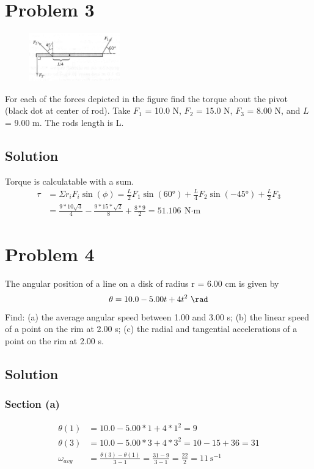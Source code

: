\documentclass[12pt]{article}
\begin{document}
\pagebreak
\section*{Problem 3}
\begin{figure}
    \vspace{-30pt}
    \includegraphics[width=0.35\textwidth]{graph_3.png} 
\end{figure}
For each of the forces depicted in the figure find the torque about the pivot (black dot at
center of rod). Take $F_1$ = 10.0 N, $F_2$ = 15.0 N, $F_3$ = 8.00 N, and $L$ = 9.00 m. The 
rods length is L.

\subsection*{Solution}
Torque is calculatable with a sum.
\begin{align*}
    \tau    &=   \Sigma r_i F_i \sin(\phi)
        =   \frac{L}{2} F_1 \sin(60\unit{\degree}) + \frac{L}{4} F_2 \sin(-45\unit{\degree}) + \frac{L}{2} F_3\\
        &=  \frac{9*10\sqrt{3}}{4} - \frac{9*15*\sqrt{2}}{8} + \frac{8*9}{2}
        =   \boxed{51.106\ \unit{\newton\cdot\meter}}
\end{align*}


\pagebreak
\section*{Problem 4}
The angular position of a line on a disk of radius r = 6.00 cm is given by
\[ \theta = 10.0 - 5.00 t + 4 t^2\ \unit{\rad} \]
Find: (a) the average angular speed between 1.00 and 3.00 s; (b) the linear speed of a point on
the rim at 2.00 s; (c) the radial and tangential accelerations of a point on the rim at 2.00 s.

\subsection*{Solution}
\subsubsection*{Section (a)}
\begin{align*}
    \theta(1)   &=  10.0 - 5.00 * 1 + 4 * 1^2
        =   9\\
    \theta(3)   &=  10.0 - 5.00 * 3 + 4 * 3^2
        =   10 - 15 + 36
        =   31\\
    \omega_{avg}    &=  \frac{\theta(3) - \theta(1)}{3 - 1}
        =   \frac{31 - 9}{3 - 1}
        =   \frac{22}{2}
        =   \boxed{11\ \unit{\second^{-1}}}
\end{align*}
\end{document}
